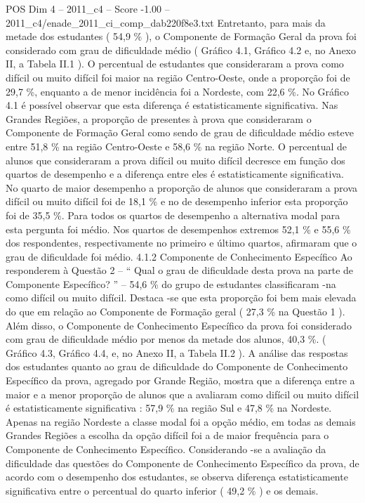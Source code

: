 \begin{textsample}{POS Dim 4 – 2011\_c4 – Score -1.00 – 2011\_c4/enade\_2011\_ci\_comp\_dab220f8e3.txt}
Entretanto, para mais da metade dos estudantes ( 54,9 \% ), o Componente de Formação Geral da prova foi considerado com grau de dificuldade médio ( Gráfico 4.1, Gráfico 4.2 e, no Anexo II, a Tabela II.1 ).
O percentual de estudantes que consideraram a prova como difícil ou muito difícil foi maior na região Centro-Oeste, onde a proporção foi de 29,7 \%, enquanto a de menor incidência foi a Nordeste, com 22,6 \%.
No Gráfico 4.1 é possível observar que esta diferença é estatisticamente significativa.
Nas Grandes Regiões, a proporção de presentes à prova que consideraram o Componente de Formação Geral como sendo de grau de dificuldade médio esteve entre 51,8 \% na região Centro-Oeste e 58,6 \% na região Norte.
O percentual de alunos que consideraram a prova difícil ou muito difícil decresce em função dos quartos de desempenho e a diferença entre eles é estatisticamente significativa.
No quarto de maior desempenho a proporção de alunos que consideraram a prova difícil ou muito difícil foi de 18,1 \% e no de desempenho inferior esta proporção foi de 35,5 \%.
Para todos os quartos de desempenho a alternativa modal para esta pergunta foi médio.
Nos quartos de desempenhos extremos 52,1 \% e 55,6 \% dos respondentes, respectivamente no primeiro e último quartos, afirmaram que o grau de dificuldade foi médio. 4.1.2 Componente de Conhecimento Específico Ao responderem à Questão 2 – “ Qual o grau de dificuldade desta prova na parte de Componente Específico? ” – 54,6 \% do grupo de estudantes classificaram -na como difícil ou muito difícil.
Destaca -se que esta proporção foi bem mais elevada do que em relação ao Componente de Formação geral ( 27,3 \% na Questão 1 ).
Além disso, o Componente de Conhecimento Específico da prova foi considerado com grau de dificuldade médio por menos da metade dos alunos, 40,3 \%. ( Gráfico 4.3, Gráfico 4.4, e, no Anexo II, a Tabela II.2 ).
A análise das respostas dos estudantes quanto ao grau de dificuldade do Componente de Conhecimento Específico da prova, agregado por Grande Região, mostra que a diferença entre a maior e a menor proporção de alunos que a avaliaram como difícil ou muito difícil é estatisticamente significativa : 57,9 \% na região Sul e 47,8 \% na Nordeste.
Apenas na região Nordeste a classe modal foi a opção médio, em todas as demais Grandes Regiões a escolha da opção difícil foi a de maior frequência para o Componente de Conhecimento Específico.
Considerando -se a avaliação da dificuldade das questões do Componente de Conhecimento Específico da prova, de acordo com o desempenho dos estudantes, se observa diferença estatisticamente significativa entre o percentual do quarto inferior ( 49,2 \% ) e os demais.

\end{textsample}
